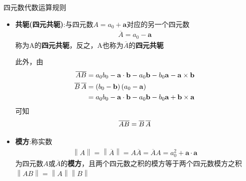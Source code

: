 \documentclass[UTF8,AutoFakeBold,AutoFakeSlant]{beamer}
\begin{document}
\begin{frame}{四元数代数运算规则}
    \begin{itemize}
        \scriptsize
        \item \textbf{共轭(四元共轭)}:与四元数$A=a_0+\mathbf{a}$对应的另一个四元数
              \begin{align*}
                  \overline{A} = a_0 - \mathbf{a}
              \end{align*}
              称为A的\textbf{四元共轭}，反之，A也称为$\overline{A}$的\textbf{四元共轭}

              此外，由
              \begin{align*}
                  \begin{split}
                      \overline{AB}                      & =a_0b_0-\mathbf{a}\cdot\mathbf{b}-a_0\mathbf{b}-b_0\mathbf{a}-\mathbf{a}\times\mathbf{b} \\
                      \overline{B}\thinspace\overline{A} & =\left(b_0-\mathbf{b}\right)\left(a_0-\mathbf{a}\right)                                  \\
                                                         & =a_0b_0-\mathbf{a}\cdot\mathbf{b}-a_0\mathbf{b}-b_0\mathbf{a}+\mathbf{b}\times\mathbf{a}
                  \end{split}
              \end{align*}
              可知
              \begin{align*}
                  \overline{AB}=\overline{B}\thinspace\overline{A}
              \end{align*}
        \item \textbf{模方}:称实数
              \begin{align*}
                  \left \| A \right \| =\left \| \overline{A} \right \| =A\overline{A}=\overline{A}A=a_0^2+\mathbf{a}\cdot\mathbf{a}
              \end{align*}
              为四元数$A$或$\overline{A}$的\textbf{模方}，且两个四元数之积的模方等于两个四元数模方之积$\left \| AB \right \|=\left \| A \right \|\left \| B \right \|$
    \end{itemize}
\end{frame}
\end{document}
